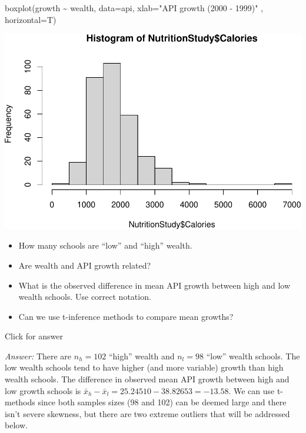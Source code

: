 \documentclass[
]{book}
\newenvironment{Shaded}{\begin{snugshade}}{\end{snugshade}}
\newcommand{\AttributeTok}[1]{\textcolor[rgb]{0.77,0.63,0.00}{#1}}
\newcommand{\FunctionTok}[1]{\textcolor[rgb]{0.00,0.00,0.00}{#1}}
\newcommand{\NormalTok}[1]{#1}
\newcommand{\SpecialCharTok}[1]{\textcolor[rgb]{0.00,0.00,0.00}{#1}}
\newcommand{\StringTok}[1]{\textcolor[rgb]{0.31,0.60,0.02}{#1}}
\providecommand{\tightlist}{%
  \setlength{\itemsep}{0pt}\setlength{\parskip}{0pt}}
\begin{document}
\begin{Shaded}
\begin{Highlighting}[]
\FunctionTok{boxplot}\NormalTok{(growth }\SpecialCharTok{\textasciitilde{}}\NormalTok{ wealth, }\AttributeTok{data=}\NormalTok{api, }\AttributeTok{xlab=}\StringTok{"API growth (2000 {-} 1999)"}\NormalTok{ , }\AttributeTok{horizontal=}\NormalTok{T)}
\end{Highlighting}
\end{Shaded}

\includegraphics[width=1\linewidth]{Class_Activity_19_files/figure-latex/unnamed-chunk-9-1}

\begin{itemize}
\tightlist
\item
  How many schools are ``low'' and ``high'' wealth.
\item
  Are wealth and API growth related?
\item
  What is the observed difference in mean API growth between high and low wealth schools. Use correct notation.
\item
  Can we use t-inference methods to compare mean growths?
\end{itemize}

Click for answer

\emph{Answer:} There are \(n_h = 102\) ``high'' wealth and \(n_l = 98\) ``low'' wealth schools. The low wealth schools tend to have higher (and more variable) growth than high wealth schools. The difference in observed mean API growth between high and low growth schools is \(\bar{x}_h - \bar{x}_l = 25.24510 - 38.82653 = -13.58\). We can use t-methods since both samples sizes (98 and 102) can be deemed large and there isn't severe skewness, but there are two extreme outliers that will be addressed below.
\end{document}
